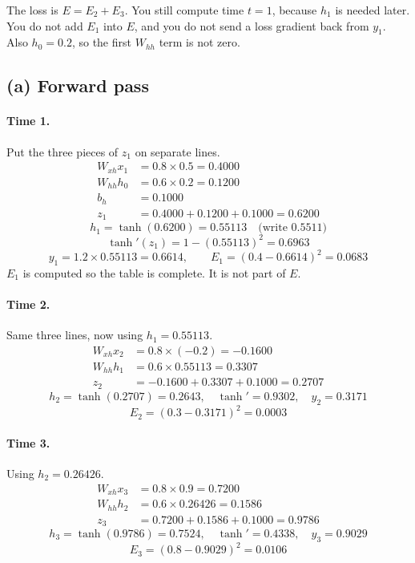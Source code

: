 \documentclass[11pt,a4paper]{article}
\begin{document}
\begin{watch}
The loss is \(E=E_2+E_3\). You still compute time \(t=1\), because \(h_1\) is needed later. You do not add \(E_1\) into \(E\), and you do not send a loss gradient back from \(y_1\). Also \(h_0=0.2\), so the first \(W_{hh}\) term is not zero.
\end{watch}

\subsection{(a) Forward pass}

\paragraph{Time 1.} Put the three pieces of \(z_1\) on separate lines.
\begin{align*}
W_{xh}x_1 &= 0.8\times 0.5 = 0.4000\\
W_{hh}h_0 &= 0.6\times 0.2 = 0.1200\\
b_h &= 0.1000\\
z_1 &= 0.4000+0.1200+0.1000 = 0.6200
\end{align*}
\[
h_1=\tanh(0.6200)=0.55113 \quad\text{(write \(0.5511\))}
\]
\[
\tanh'(z_1)=1-(0.55113)^2=0.6963
\]
\[
y_1=1.2\times 0.55113=0.6614, \qquad E_1=(0.4-0.6614)^2=0.0683
\]
\(E_1\) is computed so the table is complete. It is not part of \(E\).

\paragraph{Time 2.} Same three lines, now using \(h_1=0.55113\).
\begin{align*}
W_{xh}x_2 &= 0.8\times(-0.2)=-0.1600\\
W_{hh}h_1 &= 0.6\times 0.55113=0.3307\\
z_2 &= -0.1600+0.3307+0.1000=0.2707
\end{align*}
\[
h_2=\tanh(0.2707)=0.2643,\quad \tanh'=0.9302,\quad y_2=0.3171
\]
\[
E_2=(0.3-0.3171)^2=0.0003
\]

\paragraph{Time 3.} Using \(h_2=0.26426\).
\begin{align*}
W_{xh}x_3 &= 0.8\times 0.9=0.7200\\
W_{hh}h_2 &= 0.6\times 0.26426=0.1586\\
z_3 &= 0.7200+0.1586+0.1000=0.9786
\end{align*}
\[
h_3=\tanh(0.9786)=0.7524,\quad \tanh'=0.4338,\quad y_3=0.9029
\]
\[
E_3=(0.8-0.9029)^2=0.0106
\]
\end{document}
